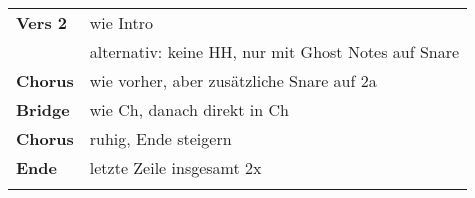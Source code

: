 \begin{tabular}{p{1.6cm}l}
	\textbf{Vers 2} & wie Intro                                           \\
	                & alternativ: keine HH, nur mit Ghost Notes auf Snare \\
	\textbf{Chorus} & wie vorher, aber zusätzliche Snare auf 2a           \\
	\textbf{Bridge} & wie Ch, danach direkt in Ch                         \\
	\textbf{Chorus} & ruhig, Ende steigern                                \\
	\textbf{Ende}   & letzte Zeile insgesamt 2x                           \\
	                &                                                     \\
\end{tabular}
